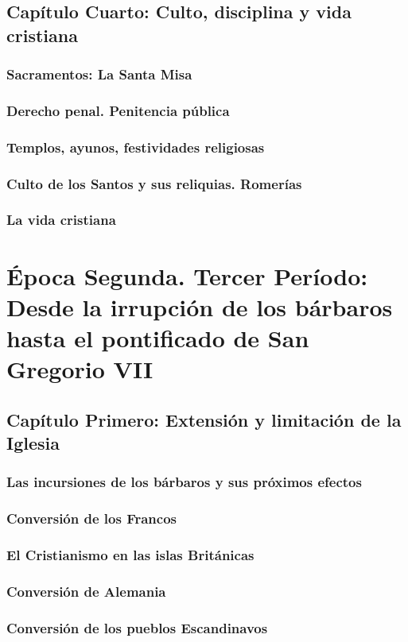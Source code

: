 \raggedbottom{} \documentclass[12pt, a4paper]{book}
\begin{document}
\chapter{Capítulo Cuarto: Culto, disciplina y vida cristiana}
\section{Sacramentos: La Santa Misa}
\section{Derecho penal. Penitencia pública}
\section{Templos, ayunos, festividades religiosas}
\section{Culto de los Santos y sus reliquias. Romerías}
\section{La vida cristiana}
\part{Época Segunda. Tercer Período: Desde la irrupción de los bárbaros hasta el pontificado de San Gregorio VII}
\chapter{Capítulo Primero: Extensión y limitación de la Iglesia}
\section{Las incursiones de los bárbaros y sus próximos efectos}
\section{Conversión de los Francos}
\section{El Cristianismo en las islas Británicas}
\section{Conversión de Alemania}
\section{Conversión de los pueblos Escandinavos}
\end{document}
